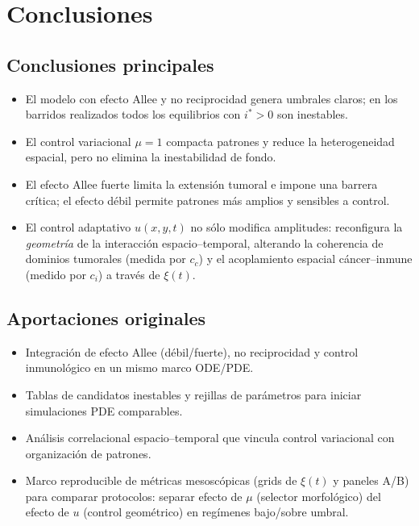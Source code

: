 \chapter{Conclusiones}
\label{chap:conclusiones}

\section{Conclusiones principales}
\begin{itemize}
  \item El modelo con efecto Allee y no reciprocidad genera umbrales claros; en los barridos realizados todos los equilibrios con $i^*>0$ son inestables.
  \item El control variacional $\mu=1$ compacta patrones y reduce la heterogeneidad espacial, pero no elimina la inestabilidad de fondo.
  \item El efecto Allee fuerte limita la extensión tumoral e impone una barrera crítica; el efecto débil permite patrones más amplios y sensibles a control.
  \item El control adaptativo $u(x,y,t)$ no sólo modifica amplitudes: reconfigura la \emph{geometría} de la interacción espacio--temporal, alterando la coherencia de dominios tumorales (medida por $c_c$) y el acoplamiento espacial cáncer--inmune (medido por $c_i$) a través de $\xi(t)$.
\end{itemize}

\section{Aportaciones originales}
\begin{itemize}
  \item Integración de efecto Allee (débil/fuerte), no reciprocidad y control inmunológico en un mismo marco ODE/PDE.
  \item Tablas de candidatos inestables y rejillas de parámetros para iniciar simulaciones PDE comparables.
  \item Análisis correlacional espacio--temporal que vincula control variacional con organización de patrones.
  \item Marco reproducible de métricas mesoscópicas (grids de $\xi(t)$ y paneles A/B) para comparar protocolos: separar efecto de $\mu$ (selector morfológico) del efecto de $u$ (control geométrico) en regímenes bajo/sobre umbral.
\end{itemize}

